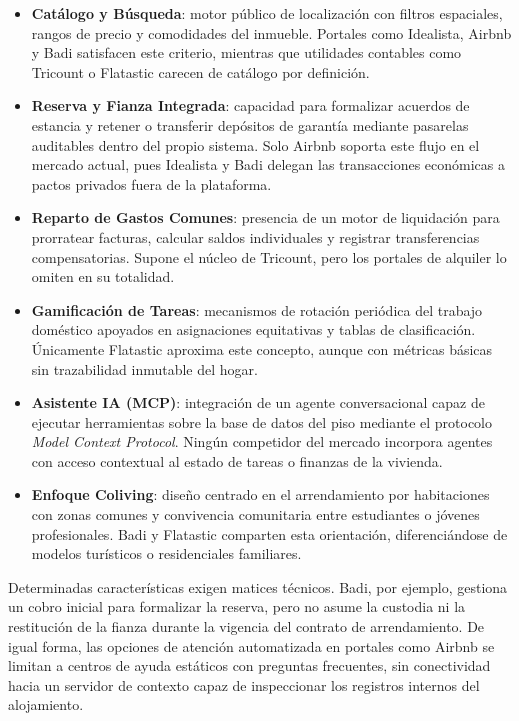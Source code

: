 \begin{itemize}
    \item \textbf{Catálogo y Búsqueda}: motor público de localización con filtros espaciales, rangos de precio y comodidades del inmueble. Portales como Idealista, Airbnb y Badi satisfacen este criterio, mientras que utilidades contables como Tricount o Flatastic carecen de catálogo por definición.
    \item \textbf{Reserva y Fianza Integrada}: capacidad para formalizar acuerdos de estancia y retener o transferir depósitos de garantía mediante pasarelas auditables dentro del propio sistema. Solo Airbnb soporta este flujo en el mercado actual, pues Idealista y Badi delegan las transacciones económicas a pactos privados fuera de la plataforma.
    \item \textbf{Reparto de Gastos Comunes}: presencia de un motor de liquidación para prorratear facturas, calcular saldos individuales y registrar transferencias compensatorias. Supone el núcleo de Tricount, pero los portales de alquiler lo omiten en su totalidad.
    \item \textbf{Gamificación de Tareas}: mecanismos de rotación periódica del trabajo doméstico apoyados en asignaciones equitativas y tablas de clasificación. Únicamente Flatastic aproxima este concepto, aunque con métricas básicas sin trazabilidad inmutable del hogar.
    \item \textbf{Asistente IA (MCP)}: integración de un agente conversacional capaz de ejecutar herramientas sobre la base de datos del piso mediante el protocolo \emph{Model Context Protocol}. Ningún competidor del mercado incorpora agentes con acceso contextual al estado de tareas o finanzas de la vivienda.
    \item \textbf{Enfoque Coliving}: diseño centrado en el arrendamiento por habitaciones con zonas comunes y convivencia comunitaria entre estudiantes o jóvenes profesionales. Badi y Flatastic comparten esta orientación, diferenciándose de modelos turísticos o residenciales familiares.
\end{itemize}

Determinadas características exigen matices técnicos. Badi, por ejemplo, gestiona un cobro inicial para formalizar la reserva, pero no asume la custodia ni la restitución de la fianza durante la vigencia del contrato de arrendamiento. De igual forma, las opciones de atención automatizada en portales como Airbnb se limitan a centros de ayuda estáticos con preguntas frecuentes, sin conectividad hacia un servidor de contexto capaz de inspeccionar los registros internos del alojamiento.